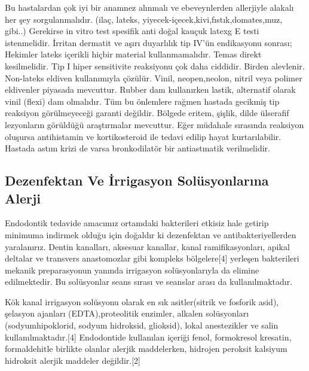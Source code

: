 Bu hastalardan çok iyi bir anamnez alınmalı ve ebeveynlerden allerjiyle alakalı her şey sorgulanmalıdır. (ilaç, lateks, yiyecek-içecek,kivi,fıstık,domates,muz, gibi..) Gerekirse in vitro test spesifik anti doğal kauçuk latexg E testi istenmelidir.
İrritan dermatit ve aşırı duyarlılık tip IV’ün endikasyonu sonrası;
Hekimler lateks içerikli hiçbir material kullanmamalıdır.  Temas direkt kesilmelidir. Tip I hiper sensitivite reaksiyonu çok daha ciddidir. Birden alevlenir.
Non-lateks eldiven kullanımıyla çözülür. Vinil, neopen,neolon, nitril veya polimer  eldivenler piyasada mevcuttur.
Rubber dam kullanırken lastik, alternatif olarak vinil (flexi) dam olmalıdır.   Tüm bu önlemlere rağmen hastada gecikmiş tip reaksiyon görülmeyeceği garanti değildir. Bölgede eritem, şişlik, dilde ülserafif lezyonların görüldüğü araştırmalar mevcuttur.
Eğer müdahale sırasında reaksiyon oluşursa antihistamin ve kortikosteroid ile tedavi edilip hayat kurtarılabilir.
Hastada astım krizi de varsa bronkodilatör bir antiastmatik verilmelidir.





\subsection{Dezenfektan Ve İrrigasyon Solüsyonlarına Alerji}
Endodontik tedavide amacımız ortamdaki bakterileri etkisiz hale getirip minimuma indirmek olduğu için doğaldır ki dezenfektan ve antibakteriyellerden yaralanırız. Dentin kanalları, aksesuar kanallar, kanal ramifikasyonları, apikal deltalar ve transvers anastomozlar gibi kompleks bölgelere[4] yerleşen bakterileri mekanik preparasyonun yanında irrigasyon solüsyonlarıyla da elimine edilmektedir. Bu solüsyonlar seans sırası ve seanslar arası da kullanılmaktadır.

Kök kanal irrigasyon solüsyonu olarak en sık asitler(sitrik ve fosforik asid), şelasyon ajanları (EDTA),proteolitik enzimler, alkalen solüsyonları (sodyumhipoklorid, sodyum hidroksid, glioksid), lokal anestezikler ve salin kullanılmaktadır.[4] Endodontide kullanılan içeriği fenol, formokresol kresatin, formaldehitle birlikte olanlar alerjik maddelerken, hidrojen peroksit kalsiyum hidroksit alerjik maddeler değildir.[2]


